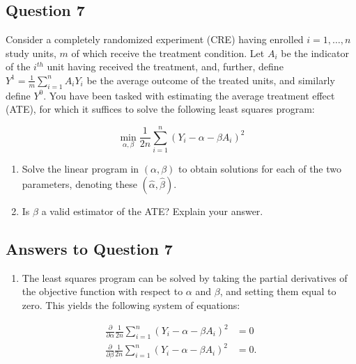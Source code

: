 \documentclass[
  letterpaper,
  DIV=11,
  numbers=noendperiod]{scrartcl}
\providecommand{\tightlist}{%
  \setlength{\itemsep}{0pt}\setlength{\parskip}{0pt}}\usepackage{longtable,booktabs,array}
\newcommand{\pp}[2][]{\frac{\partial#1}{\partial#2}}
\begin{document}
\newpage

\hypertarget{question-7}{%
\subsection{Question 7}\label{question-7}}

Consider a completely randomized experiment (CRE) having enrolled
\(i = 1, \ldots, n\) study units, \(m\) of which receive the treatment
condition. Let \(A_i\) be the indicator of the \(i^{th}\) unit having
received the treatment, and, further, define
\(Y^1 = \frac{1}{m} \sum_{i=1}^n A_i Y_i\) be the average outcome of the
treated units, and similarly define \(Y^0\). You have been tasked with
estimating the average treatment effect (ATE), for which it suffices to
solve the following least squares program:

\[
\min_{\alpha,\beta} \frac{1}{2n} \sum_{i=1}^n (Y_i - \alpha - \beta A_i)^2
\]

\begin{enumerate}
\def\labelenumi{\alph{enumi})}
\item
  Solve the linear program in \((\alpha, \beta)\) to obtain solutions
  for each of the two parameters, denoting these
  \((\hat{\alpha}, \hat{\beta})\).
\item
  Is \(\hat{\beta}\) a valid estimator of the ATE? Explain your answer.
\end{enumerate}

\hypertarget{answers-to-question-7}{%
\subsection{Answers to Question 7}\label{answers-to-question-7}}

\begin{enumerate}
\def\labelenumi{\alph{enumi})}
\tightlist
\item
  The least squares program can be solved by taking the partial
  derivatives of the objective function with respect to \(\alpha\) and
  \(\beta\), and setting them equal to zero. This yields the following
  system of equations:
\end{enumerate}

\[
\begin{aligned}
\pp{\alpha} \frac{1}{2n} \sum_{i=1}^n (Y_i - \alpha - \beta A_i)^2 & = 0 \\
\pp{\beta} \frac{1}{2n} \sum_{i=1}^n (Y_i - \alpha - \beta A_i)^2 & = 0 .
\end{aligned}
\]
\end{document}
